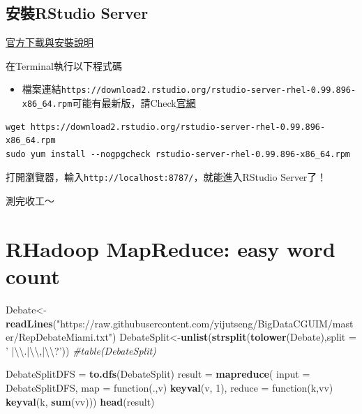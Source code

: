 \documentclass[]{book}
\newenvironment{Shaded}{\begin{snugshade}}{\end{snugshade}}
\newcommand{\KeywordTok}[1]{\textcolor[rgb]{0.13,0.29,0.53}{\textbf{{#1}}}}
\newcommand{\DataTypeTok}[1]{\textcolor[rgb]{0.13,0.29,0.53}{{#1}}}
\newcommand{\DecValTok}[1]{\textcolor[rgb]{0.00,0.00,0.81}{{#1}}}
\newcommand{\CharTok}[1]{\textcolor[rgb]{0.31,0.60,0.02}{{#1}}}
\newcommand{\StringTok}[1]{\textcolor[rgb]{0.31,0.60,0.02}{{#1}}}
\newcommand{\CommentTok}[1]{\textcolor[rgb]{0.56,0.35,0.01}{\textit{{#1}}}}
\newcommand{\NormalTok}[1]{{#1}}
\providecommand{\tightlist}{%
  \setlength{\itemsep}{0pt}\setlength{\parskip}{0pt}}
\theoremstyle{definition}
\theoremstyle{definition}
\theoremstyle{remark}
\begin{document}
\subsection{安裝RStudio Server}\label{rstudio-server}

\href{https://www.rstudio.com/products/rstudio/download-server/}{官方下載與安裝說明}

在Terminal執行以下程式碼

\begin{itemize}
\tightlist
\item
  檔案連結\texttt{https://download2.rstudio.org/rstudio-server-rhel-0.99.896-x86\_64.rpm}可能有最新版，請Check\href{https://www.rstudio.com/products/rstudio/download-server/}{官網}
\end{itemize}

\begin{verbatim}
wget https://download2.rstudio.org/rstudio-server-rhel-0.99.896-x86_64.rpm
sudo yum install --nogpgcheck rstudio-server-rhel-0.99.896-x86_64.rpm
\end{verbatim}

打開瀏覽器，輸入\texttt{http://localhost:8787/}，就能進入RStudio
Server了！

測完收工～

\section{RHadoop MapReduce: easy word
count}\label{rhadoop-mapreduce-easy-word-count}

\begin{Shaded}
\begin{Highlighting}[]
\NormalTok{Debate<-}\KeywordTok{readLines}\NormalTok{(}\StringTok{"https://raw.githubusercontent.com/yijutseng/BigDataCGUIM/master/RepDebateMiami.txt"}\NormalTok{)}
\NormalTok{DebateSplit<-}\KeywordTok{unlist}\NormalTok{(}\KeywordTok{strsplit}\NormalTok{(}\KeywordTok{tolower}\NormalTok{(Debate),}\DataTypeTok{split =} \StringTok{' |}\CharTok{\textbackslash{}\textbackslash{}}\StringTok{.|}\CharTok{\textbackslash{}\textbackslash{}}\StringTok{,|}\CharTok{\textbackslash{}\textbackslash{}}\StringTok{?'}\NormalTok{))}
\CommentTok{#table(DebateSplit)}
\end{Highlighting}
\end{Shaded}

\begin{Shaded}
\begin{Highlighting}[]
\NormalTok{DebateSplitDFS =}\StringTok{ }\KeywordTok{to.dfs}\NormalTok{(DebateSplit)}
\NormalTok{result =}\StringTok{ }\KeywordTok{mapreduce}\NormalTok{(}
    \DataTypeTok{input =} \NormalTok{DebateSplitDFS,}
    \DataTypeTok{map =} \NormalTok{function(.,v) }\KeywordTok{keyval}\NormalTok{(v, }\DecValTok{1}\NormalTok{),}
    \DataTypeTok{reduce =} \NormalTok{function(k,vv) }\KeywordTok{keyval}\NormalTok{(k, }\KeywordTok{sum}\NormalTok{(vv)))}
\KeywordTok{head}\NormalTok{(result)}
\end{Highlighting}
\end{Shaded}
\end{document}
